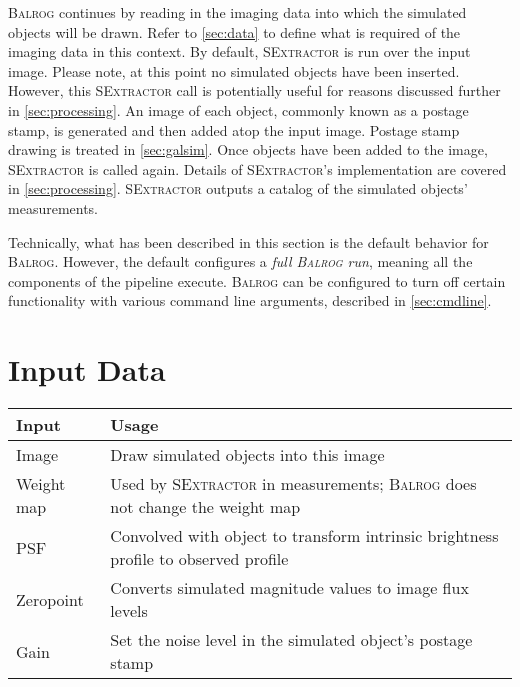 \documentclass[11pt]{book}
\newcommand{\balrog}{\textsc{Balrog}}
\newcommand{\sex}{\textsc{SExtractor}}
\begin{document}
\balrog{} continues by reading in the imaging data into which the simulated objects will be drawn.
Refer to \autoref{sec:data} to define what is required of the imaging data in this context.
By default, \sex{} is run over the input image. Please note, at this point no simulated
objects have been inserted. However, this \sex{} call is potentially useful
for reasons discussed further in \autoref{sec:processing}.
An image of each object, commonly known as a postage stamp, is generated and then added atop the input image.
Postage stamp drawing is treated in \autoref{sec:galsim}.
Once objects have been added to the image, \sex{} is called again.
Details of \sex{}'s implementation are covered in \autoref{sec:processing}.
\sex{} outputs a catalog of the simulated objects' measurements.

Technically, what has been described in this section is the default behavior for \balrog{}.
However, the default configures a \textit{full \balrog{} run}, 
meaning all the components of the pipeline execute.
\balrog{} can be configured to turn off certain functionality with various command line arguments,
described in \autoref{sec:cmdline}.



\section{Input Data}
\label{sec:data}


\begin{table}
\caption{Brief summary of imaging inputs to \balrog{}}
\label{tab:input}
\begin{longtabu} to \textwidth {l X}
\toprule %
\textbf{Input} & \textbf{Usage} \\ \midrule
Image & Draw simulated objects into this image\\
Weight map & Used by \sex{} in measurements; \balrog{} does not change the weight map\\
PSF & Convolved with object to transform intrinsic brightness profile to observed profile\\
Zeropoint & Converts simulated magnitude values to image flux levels\\
Gain & Set the noise level in the simulated object's postage stamp\\
\bottomrule %
\end{longtabu}
\end{table}
\end{document}
